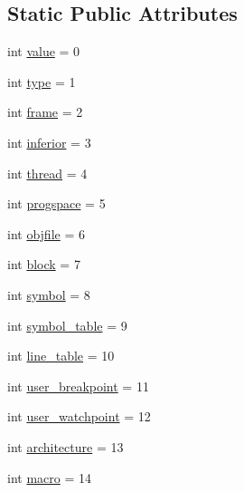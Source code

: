 \subsection*{Static Public Attributes}
\begin{DoxyCompactItemize}
\item 
int \hyperlink{classmorunner_1_1communication_1_1Subject_ab43ed6150da716dccc34f12e9ea60eb9}{value} = 0
\item 
int \hyperlink{classmorunner_1_1communication_1_1Subject_a14af2bb1b6e526ffdca900d719cbf169}{type} = 1
\item 
int \hyperlink{classmorunner_1_1communication_1_1Subject_a096a79c71387142b11d5d536bda224ef}{frame} = 2
\item 
int \hyperlink{classmorunner_1_1communication_1_1Subject_a50b156272f64da73b4b8799847578da8}{inferior} = 3
\item 
int \hyperlink{classmorunner_1_1communication_1_1Subject_af7cf15dff5836ca6019013f443065bf0}{thread} = 4
\item 
int \hyperlink{classmorunner_1_1communication_1_1Subject_ab8f9822ebaf741ec0a2c549dd05c32b6}{progspace} = 5
\item 
int \hyperlink{classmorunner_1_1communication_1_1Subject_ad1990b04607b95087b9fbd3838f61db6}{objfile} = 6
\item 
int \hyperlink{classmorunner_1_1communication_1_1Subject_a4164b6a9955ed4dcd4710a50b28bbeac}{block} = 7
\item 
int \hyperlink{classmorunner_1_1communication_1_1Subject_a47691d34d36ac6b6009eebeb30a137f7}{symbol} = 8
\item 
int \hyperlink{classmorunner_1_1communication_1_1Subject_a2d1c9aa83c85cbdf689428420f72c002}{symbol\+\_\+table} = 9
\item 
int \hyperlink{classmorunner_1_1communication_1_1Subject_aea4d95ee9a997eeb2368bf8665837517}{line\+\_\+table} = 10
\item 
int \hyperlink{classmorunner_1_1communication_1_1Subject_a1e3fcdc8be94d51e906d17e7c0235556}{user\+\_\+breakpoint} = 11
\item 
int \hyperlink{classmorunner_1_1communication_1_1Subject_abbc303b6440251f7eb90012d1d1e12b9}{user\+\_\+watchpoint} = 12
\item 
int \hyperlink{classmorunner_1_1communication_1_1Subject_ae8f2eb6f002dc62290238d42280975a0}{architecture} = 13
\item 
int \hyperlink{classmorunner_1_1communication_1_1Subject_a632bc45f41b3da11876076c3ec353e21}{macro} = 14
\end{DoxyCompactItemize}


